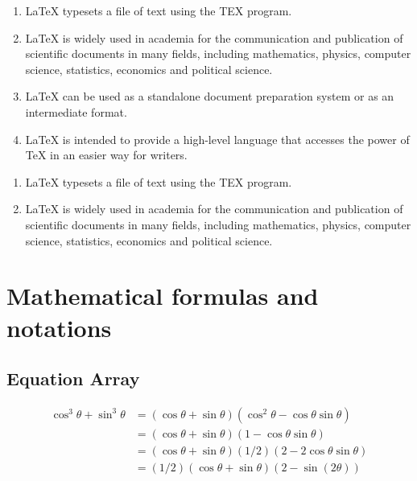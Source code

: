 \documentclass[12pt,a4paper]{article}
\begin{document}
\begin{enumerate}[I]

\item \LaTeX{} typesets a file of text using the TEX program.

\item \LaTeX{} is widely used in academia for the communication and publication
of scientific documents in many fields, including mathematics, physics,
computer science, statistics, economics and political science.

\item \LaTeX{} can be used as a standalone document preparation system or as an
intermediate format.

\item \LaTeX{} is intended to provide a high-level language that accesses the power
of TeX in an easier way for writers.

\end{enumerate}

\begin{enumerate}[label=(\alph*)]

\item \LaTeX{} typesets a file of text using the TEX program.

\item \LaTeX{} is widely used in academia for the communication and publication
of scientific documents in many fields, including mathematics, physics,
computer science, statistics, economics and political science.

\end{enumerate}

\newpage

\section{Mathematical formulas and notations}

\subsection{Equation Array}
     \begin{align}
     \cos^3{\theta} + \sin^3{\theta} &= (\cos{\theta} + \sin{\theta})(\cos^2{\theta} - \cos{\theta}\sin{\theta}) \\
    &= (\cos{\theta} + \sin{\theta})(1 - \cos{\theta}\sin{\theta}) \\
    &= (\cos{\theta} + \sin{\theta})(1 / 2)(2 - 2\cos{\theta}\sin{\theta}) \\
    &= (1 / 2)(\cos{\theta} + \sin{\theta})(2 - \sin{(2\theta)})
     \end{align}
 
\end{document}

